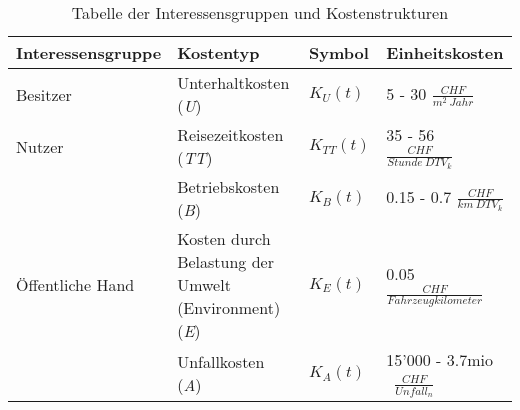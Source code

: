 %
%
%
%

\begin{table}[ht!]
\flushleft
%
%
\begin{tabular}{@{}p{3.5cm} p{4cm} p{1.35cm} p{4.55cm}@{}} \\   
\toprule
\textbf{Interessensgruppe} & \textbf{Kostentyp} & \textbf{Symbol} & \textbf{Einheitskosten} \\
\midrule
Besitzer                   & Unterhaltkosten (\textit{U})                    & $K_{U}(t)$    & 5 - 30 $\frac{CHF}{m^2 \ Jahr}$              \\
Nutzer		               & Reisezeitkosten (\textit{TT})                   & $K_{TT}(t)$   & 35 - 56 $\frac{CHF}{Stunde \ DTV_{k}}$               \\
                           & Betriebskosten (\textit{B})            		 & $K_{B}(t)$    & 0.15 - 0.7 $\frac{CHF}{km \ DTV_{k}}$              \\
Öffentliche Hand           & Kosten durch Belastung \newline der Umwelt \newline (Environment) (\textit{E})   & $K_{E}(t)$    & 0.05 $\frac{CHF}{Fahrzeugkilometer}$      \\
                           & Unfallkosten (\textit{A})                       & $K_{A}(t)$    & 15'000 - 3.7mio \ $\frac{CHF}{Unfall_{n}}$    \\
\bottomrule

\end{tabular}
\caption{Tabelle der Interessensgruppen und Kostenstrukturen}
\label{tab:t-04-01-Interessensgruppen}
\end{table}


%


